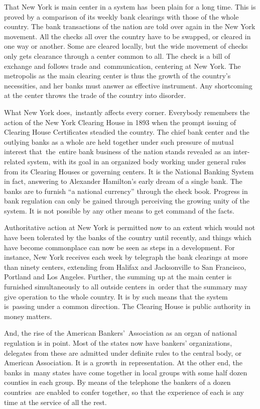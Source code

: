 \documentclass[openany,nobib]{tufte-book}
\begin{document}
That New York is main center in a system has~been plain for a long time.
This is proved by a comparison of its weekly bank clearings with those
of the whole country. The bank transactions of the nation are told over
again in the New York movement. All the checks all over the country have
to be swapped, or cleared in one way or another. Some are cleared
locally, but the wide movement of checks only gets clearance through a
center common to all. The check is a bill of exchange and follows trade
and~communication, centering at New York. The metropolis as the main
clearing center is thus the growth of the country's necessities, and her
banks must answer as effective instrument. Any shortcoming at the center
throws the trade of the country into disorder. ~

\pagebreak What New York does,~instantly affects every corner. Everybody remembers
the action of the New York Clearing House in 1893 when the prompt
issuing of Clearing House Certificates steadied the country. The chief
bank center and the outlying banks as a whole are held together under
such pressure of mutual interest that~the~entire bank business of the
nation stands revealed as an inter-related system, with its goal in an
organized body working under general rules from its Clearing Houses or
governing centers. It is the National Banking System in fact, answering
to Alexander Hamilton's early dream of a single bank. The banks are to
furnish ``a national currency'' through the check book. Progress in bank
regulation can only be gained through perceiving the growing unity of
the system. It is not possible by any other means to get command of the
facts.~

Authoritative action at New York is permitted now to an extent which
would not have been tolerated by the banks of the country until
recently, and things which have become commonplace can now be seen as
steps in a development. For instance, New York receives each week by
telegraph the bank clearings at more than ninety centers, extending from
Halifax and Jacksonville to San Francisco, Portland and Los Angeles.
Further, the summing up at the main center is furnished simultaneously
to all outside centers in~order that the summary may give operation to
the whole country. It is by such means that the system is~passing under
a common direction. The Clearing House is public authority in money
matters.~~

And, the rise of the American Bankers'~Association as an organ of
national regulation is in point. Most of the states now have bankers'
organizations, delegates from these are admitted under definite rules to
the central body, or American Association. It is a growth~in
representation. At the other end, the banks in~many states have come
together in local groups with some half dozen counties in each group. By
means of the telephone the bankers of a dozen countries~are enabled to
confer together, so that the experience of each is any time at the
service of all the rest.
\end{document}
